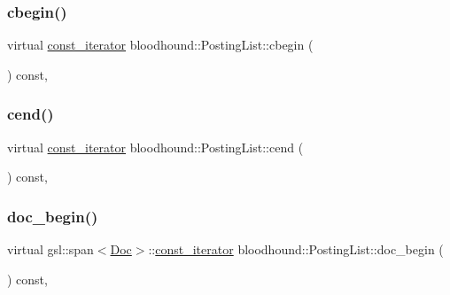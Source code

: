 \mbox{\label{classbloodhound_1_1PostingList_a44980317210bfe6c9f7d59dbea1cbd4a}} 
\subsubsection{\texorpdfstring{cbegin()}{cbegin()}}
{\footnotesize\ttfamily virtual \hyperlink{structbloodhound_1_1PostingList_1_1const__iterator}{const\+\_\+iterator} bloodhound\+::\+Posting\+List\+::cbegin (\begin{DoxyParamCaption}{ }\end{DoxyParamCaption}) const\hspace{0.3cm}{\ttfamily [inline]}, {\ttfamily [virtual]}}

\mbox{\label{classbloodhound_1_1PostingList_a7eca0ae1f54ddc48757a4fb3c0b885ce}} 
\subsubsection{\texorpdfstring{cend()}{cend()}}
{\footnotesize\ttfamily virtual \hyperlink{structbloodhound_1_1PostingList_1_1const__iterator}{const\+\_\+iterator} bloodhound\+::\+Posting\+List\+::cend (\begin{DoxyParamCaption}{ }\end{DoxyParamCaption}) const\hspace{0.3cm}{\ttfamily [inline]}, {\ttfamily [virtual]}}

\mbox{\label{classbloodhound_1_1PostingList_aac3dbe7fbf43ce93031e97b16bcfc888}} 
\subsubsection{\texorpdfstring{doc\+\_\+begin()}{doc\_begin()}}
{\footnotesize\ttfamily virtual gsl\+::span$<$\hyperlink{structbloodhound_1_1Doc}{Doc}$>$\+::\hyperlink{structbloodhound_1_1PostingList_1_1const__iterator}{const\+\_\+iterator} bloodhound\+::\+Posting\+List\+::doc\+\_\+begin (\begin{DoxyParamCaption}{ }\end{DoxyParamCaption}) const\hspace{0.3cm}{\ttfamily [inline]}, {\ttfamily [virtual]}}

